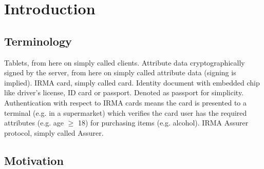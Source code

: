 \section{Introduction}

\subsection{Terminology}
Tablets, from here on simply called clients.
Attribute data cryptographically signed by the server, from here on simply called attribute data (signing is implied).
IRMA card, simply called card.
Identity document with embedded chip like driver's license, ID card or passport. Denoted as passport for simplicity.
Authentication with respect to IRMA cards means the card is presented to a terminal (e.g. in a supermarket) which verifies the card user has the required attributes (e.g. age $\geq$ 18) for purchasing items (e.g. alcohol).
IRMA Assurer protocol, simply called Assurer.

\subsection{Motivation}
